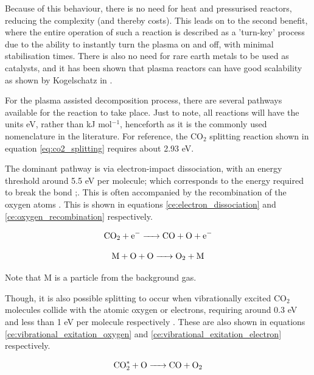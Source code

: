 Because of this behaviour, there is no need for heat and pressurised reactors, reducing the complexity (and thereby costs). This leads on to the second benefit, where the entire operation of such a reaction is described as a 'turn-key' process due to the ability to instantly turn the plasma on and off, with minimal stabilisation times. There is also no need for rare earth metals to be used as catalysts, and it has been shown that plasma reactors can have good scalability as shown by Kogelschatz in \cite{kogelschatz_2003}. 

For the plasma assisted decomposition process, there are several pathways available for the reaction to take place. Just to note, all reactions will have the units eV, rather than kJ mol$^{-1}$, henceforth as it is the commonly used nomenclature in the literature. For reference, the CO$_2$ splitting reaction shown in equation \ref{eq:co2_splitting} requires about 2.93 eV.

The dominant pathway is via electron-impact dissociation, with an energy threshold around 5.5 eV per molecule; which corresponds to the energy required to break the  bond \cite{Bogaerts2020};. This is often accompanied by the recombination of the oxygen atoms \cite{Chen18}. This is shown in equations \ref{ce:electron_dissociation} and \ref{ce:oxygen_recombination} respectively.

\begin{equation}
    \ce{CO_2 + e^{-} -> CO + O + e^{-}}
    \label{ce:electron_dissociation}
\end{equation}

\begin{equation}
    \ce{M + O + O -> O_2 + M}
    \label{ce:oxygen_recombination}
\end{equation}

Note that M is a particle from the background gas.

\newpage

Though, it is also possible splitting to occur when vibrationally excited CO$_2$ molecules collide with the atomic oxygen or electrons, requiring around 0.3 eV and less than 1 eV per molecule respectively \cite{Chen18}. These are also shown in equations \ref{ce:vibrational_exitation_oxygen} and \ref{ce:vibrational_exitation_electron} respectively.

\begin{equation}
    \ce{CO^*_2 + O -> CO + O_2}
    \label{ce:vibrational_exitation_oxygen}
\end{equation}

